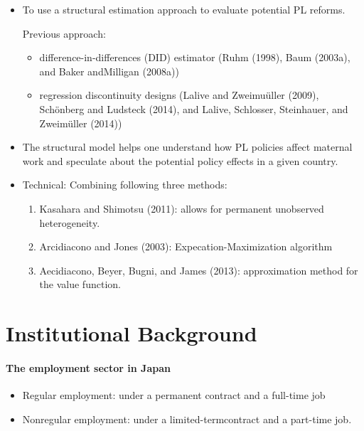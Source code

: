 \documentclass[../root]{subfiles}
\begin{document}
    \begin{itemize}
      \item To use a structural estimation approach to evaluate potential PL reforms.

      Previous approach:
      \begin{itemize}
        \item difference-in-differences (DID) estimator (Ruhm (1998), Baum (2003a), and Baker andMilligan (2008a))
        \item regression discontinuity designs (Lalive and Zweimu\"{u}ller (2009), Sch\"{o}nberg and Ludsteck (2014), and Lalive, Schlosser, Steinhauer, and Zweim\"{u}ller (2014))
      \end{itemize}
      \item The structural model helps one understand how PL policies affect maternal work and speculate about the potential policy effects in a given country.
    \end{itemize}
    \begin{itemize}
      \item Technical: Combining following three methods:
      \begin{enumerate}
        \item Kasahara and Shimotsu (2011): allows for permanent unobserved heterogeneity.
        \item Arcidiacono and Jones (2003): Expecation-Maximization algorithm
        \item Aecidiacono, Beyer, Bugni, and James (2013): approximation method for the value function.
      \end{enumerate}
    \end{itemize}


    \section{Institutional Background}

    \paragraph{The employment sector in Japan}

    \begin{itemize}
      \item Regular employment: under a permanent contract and a full-time job
      \item Nonregular employment: under a limited-termcontract and a part-time job.
    \end{itemize}
\end{document}

